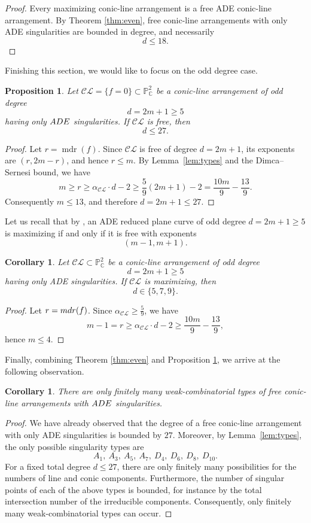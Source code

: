 \documentclass[10pt,a4paper]{amsart}
\newtheorem{proposition}[theorem]{Proposition}
\newtheorem{corollary}[theorem]{Corollary}
\begin{document}
\begin{proof}
Every maximizing conic-line arrangement is a free
ADE conic-line arrangement. By Theorem \ref{thm:even}, free conic-line arrangements with only ADE singularities are bounded in degree, and necessarily
\[
d\leq 18.
\]
\end{proof}
Finishing this section, we would like to focus on the odd degree case.
\begin{proposition}
\label{odd}
Let $\mathcal{CL} = \{f=0\} \subset \mathbb{P}^{2}_{\mathbb{C}}$ be a conic-line arrangement of odd degree
$$d = 2m+1 \geq 5$$
having only ${\rm ADE}$ singularities. If $\mathcal{CL}$ is free, then
$$d \leq 27.$$
\end{proposition}
\begin{proof}
Let $r=\operatorname{mdr}(f)$. Since $\mathcal{CL}$ is free of degree
$d=2m+1$, its exponents are $(r,2m-r)$, and hence $r\leq m$.
By Lemma~\ref{lem:types} and the Dimca--Sernesi bound, we have
\[
m\geq r\geq \alpha_{\mathcal{CL}}\cdot d-2
\geq \frac{5}{9}(2m+1)-2
=\frac{10m}{9}-\frac{13}{9}.
\]
Consequently $m\leq 13$, and therefore $d=2m+1\leq 27$.
\end{proof}
Let us recall that by \cite[Proposition 5.1(a)]{max}, an ADE reduced plane curve of odd degree $d=2m+1 \geq 5$ is maximizing if and only if it is free with exponents
\[
(m-1,m+1).
\]
\begin{corollary}
Let $\mathcal{CL}\subset \mathbb{P}^2_{\mathbb{C}}$ be a conic-line arrangement of odd degree
\[
d=2m+1\geq 5
\]
having only ADE singularities. If $\mathcal{CL}$ is maximizing, then
\[
d \in \{5,7,9\}.
\]
\end{corollary}
\begin{proof}
Let $r = {\rm mdr}(f)$. Since $\alpha_{\mathcal{CL}} \geq \frac{5}{9}$, we have
$$ m-1 = r \geq \alpha_{\mathcal{CL}}\cdot d -2  \geq  \frac{10m}{9} - \frac{13}{9},$$
hence $m \leq 4$.
\end{proof}
Finally, combining Theorem \ref{thm:even} and Proposition \ref{odd}, we arrive at the following observation.
\begin{corollary}
There are only finitely many weak-combinatorial types of free conic-line arrangements with ${\rm ADE}$ singularities.
\end{corollary}
\begin{proof}
We have already observed that the degree of a free conic-line
arrangement with only ADE singularities is bounded by $27$. Moreover,
by Lemma~\ref{lem:types}, the only possible singularity types are
\[
A_1,\ A_3,\ A_5,\ A_7,\ D_4,\ D_6,\ D_8,\ D_{10}.
\]
For a fixed total degree $d\leq 27$, there are only finitely many
possibilities for the numbers of line and conic components. Furthermore,
the number of singular points of each of the above types is bounded,
for instance by the total intersection number of the irreducible
components. Consequently, only finitely many weak-combinatorial types
can occur.
\end{proof}
\end{document}
